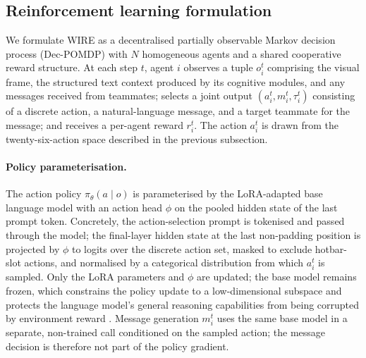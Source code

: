 \documentclass{article}
\theoremstyle{plain}
\theoremstyle{definition}
\theoremstyle{remark}
\begin{document}
\subsection{Reinforcement learning formulation}
\label{sec:rl_formulation}

We formulate WIRE as a decentralised partially observable Markov decision process (Dec-POMDP) \cite{bernstein2002complexity} with $N$ homogeneous agents and a shared cooperative reward structure. At each step $t$, agent $i$ observes a tuple $o_i^t$ comprising the visual frame, the structured text context produced by its cognitive modules, and any messages received from teammates; selects a joint output $(a_i^t, m_i^t, \tau_i^t)$ consisting of a discrete action, a natural-language message, and a target teammate for the message; and receives a per-agent reward $r_i^t$. The action $a_i^t$ is drawn from the twenty-six-action space described in the previous subsection.

\paragraph{Policy parameterisation.}
The action policy $\pi_\theta(a \mid o)$ is parameterised by the LoRA-adapted base language model with an action head $\phi$ on the pooled hidden state of the last prompt token. Concretely, the action-selection prompt is tokenised and passed through the model; the final-layer hidden state at the last non-padding position is projected by $\phi$ to logits over the discrete action set, masked to exclude hotbar-slot actions, and normalised by a categorical distribution from which $a_i^t$ is sampled. Only the LoRA parameters and $\phi$ are updated; the base model remains frozen, which constrains the policy update to a low-dimensional subspace and protects the language model's general reasoning capabilities from being corrupted by environment reward \cite{hu2022lora, qian2025toolrl}. Message generation $m_i^t$ uses the same base model in a separate, non-trained call conditioned on the sampled action; the message decision is therefore not part of the policy gradient.
\end{document}
